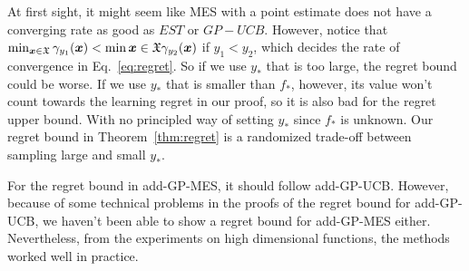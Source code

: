 At first sight, it might seem like MES with a point estimate does not have a converging rate as good as $EST$ or $GP-UCB$. However, notice that $\min_{{\boldsymbol{x}}\in\mathfrak X}\gamma_{y_1}({\boldsymbol{x}}) < \min{{\boldsymbol{x}}\in\mathfrak X} \gamma_{y_2}({\boldsymbol{x}})$ if $y_1 < y_2$, which decides the rate of convergence in Eq.~\ref{eq:regret}. So if we use $y_*$ that is too large, the regret bound could be worse. If we use $y_*$ that is smaller than $f_*$, however, its value won't count towards the learning regret in our proof, so it is also bad for the regret upper bound. With no principled way of setting $y_*$ since $f_*$ is unknown. Our regret bound in Theorem~\ref{thm:regret} is a randomized trade-off between sampling large and small $y_*$.

For the regret bound in add-GP-MES, it should follow add-GP-UCB. However, because of some technical problems in the proofs of the regret bound for add-GP-UCB, we haven't been able to show a regret bound for add-GP-MES either. Nevertheless, from the experiments on high dimensional functions, the methods worked well in practice.